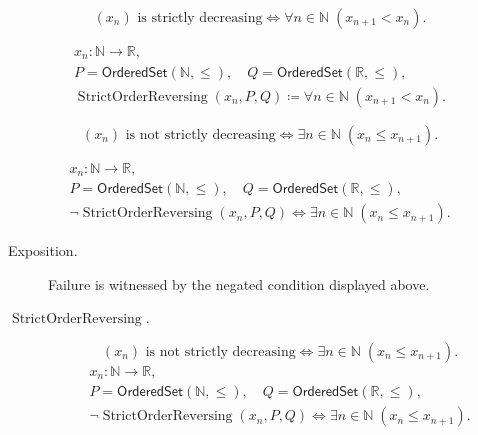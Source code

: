 \begin{remark*}
\[
(x_n)\text{ is strictly decreasing}
\Longleftrightarrow
\forall n\in\mathbb{N}\;(x_{n+1}<x_n).
\]
\end{remark*}

\begin{remark*}
\[
\begin{gathered}
x_n\colon\mathbb{N}\to\mathbb{R},\\
P=\mathsf{OrderedSet}(\mathbb{N},\leq),\quad
Q=\mathsf{OrderedSet}(\mathbb{R},\leq),\\
\operatorname{StrictOrderReversing}(x_n,P,Q)
\coloneqq
\forall n\in\mathbb{N}\;(x_{n+1}<x_n).
\end{gathered}
\]
\end{remark*}

\begin{remark*}
\[
(x_n)\text{ is not strictly decreasing}
\Longleftrightarrow
\exists n\in\mathbb{N}\;(x_n\le x_{n+1}).
\]
\end{remark*}

\begin{remark*}
\[
\begin{gathered}
x_n\colon\mathbb{N}\to\mathbb{R},\\
P=\mathsf{OrderedSet}(\mathbb{N},\leq),\quad
Q=\mathsf{OrderedSet}(\mathbb{R},\leq),\\
\neg\operatorname{StrictOrderReversing}(x_n,P,Q)
\Longleftrightarrow
\exists n\in\mathbb{N}\;(x_n\le x_{n+1}).
\end{gathered}
\]
\end{remark*}
\begin{remark*}
\begin{description}
  \item[Exposition.]
Failure is witnessed by the negated condition displayed above.
  \item[\(\operatorname{StrictOrderReversing}.\)]
\[
(x_n)\text{ is not strictly decreasing}
\Longleftrightarrow
\exists n\in\mathbb{N}\;(x_n\le x_{n+1}).
\]
\[
\begin{gathered}
x_n\colon\mathbb{N}\to\mathbb{R},\\
P=\mathsf{OrderedSet}(\mathbb{N},\leq),\quad
Q=\mathsf{OrderedSet}(\mathbb{R},\leq),\\
\neg\operatorname{StrictOrderReversing}(x_n,P,Q)
\Longleftrightarrow
\exists n\in\mathbb{N}\;(x_n\le x_{n+1}).
\end{gathered}
\]
\end{description}
\end{remark*}

